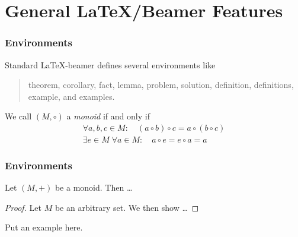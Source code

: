 \documentclass[utf8,aspectratio=169,ngerman,english]{beamer}
\begin{document}







\section{General \LaTeX/Beamer Features}


\begin{frame}
\frametitle{Environments}

Standard \LaTeX-beamer defines several environments like
\begin{quote}
theorem, corollary, fact, lemma, problem, solution, definition, definitions, example, and examples.
\end{quote}

\begin{definition}[Monoid]
We call $(M,\circ)$ a \emph{monoid} if and only if
\begin{gather*}
\forall a,b,c\in M:\quad(a\circ b)\circ c = a\circ(b\circ c) \tag{associativity}\\
\exists e\in M \;\forall a\in M:\quad a\circ e = e\circ a= a \tag{neutral element}
\end{gather*}
\end{definition}
\end{frame}

\begin{frame}
\frametitle{Environments}

\begin{theorem}
Let $(M,+)$ be a monoid. Then \ldots
\end{theorem}

\begin{proof}
Let $M$ be an arbitrary set. We then show \ldots
\end{proof}

\begin{example}
Put an example here.
\end{example}
\end{frame}
\end{document}
